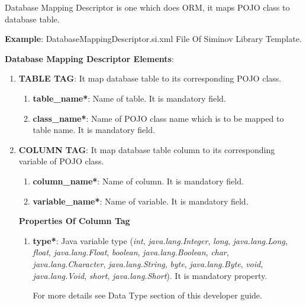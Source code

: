 Database Mapping Descriptor is one which does ORM, it maps POJO class to database table.



\textbf{Example}: DatabaseMappingDescriptor.si.xml File Of Siminov Library Template.



\newpage
\textbf{Database Mapping Descriptor Elements}:

\begin{enumerate}

	\item \small \textbf{TABLE TAG}: It map database table to its corresponding POJO class.

		\begin{enumerate}

			\item \small \textbf{table\_name*}: Name of table. It is mandatory field.
			\item \small \textbf{class\_name*}: Name of POJO class name which is to be mapped to table name. It is mandatory field.

		\end{enumerate}


	\item \small \textbf{COLUMN TAG}: It map database table column to its corresponding variable of POJO class.

		\begin{enumerate}

			\item \small \textbf{column\_name*}: Name of column. It is mandatory field.
			\item \small \textbf{variable\_name*}: Name of variable. It is mandatory field.

		\end{enumerate}

		
		\par
		\textbf{Properties Of Column Tag}
	
		\begin{enumerate}

			\item \small \textbf{type*}: Java variable type (\textit{int}, \textit{java.lang.Integer}, \textit{long}, \textit{java.lang.Long}, \textit{float}, \textit{java.lang.Float}, \textit{boolean}, \textit{java.lang.Boolean}, \textit{char}, \textit{java.lang.Character}, \textit{java.lang.String}, \textit{byte}, \textit{java.lang.Byte}, \textit{void}, \textit{java.lang.Void}, \textit{short}, \textit{java.lang.Short}). It is mandatory property. 
				\par
				For more details see Data Type section of this developer guide.
			

\end{enumerate}
\end{enumerate}
